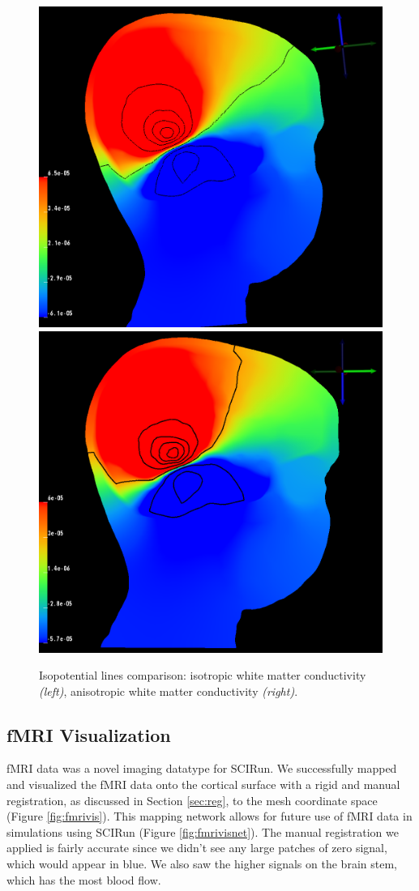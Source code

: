 \begin{figure}[H]
\begin{center}
\includegraphics[width=.49\textwidth]{Figures/iso_isolines}
\includegraphics[width = .49\textwidth]{Figures/aniso_isolines}
\caption{Isopotential lines comparison: isotropic white matter conductivity \textit{(left)}, anisotropic white matter conductivity \textit{(right)}.}
\label{fig:isolines}
\end{center}
\end{figure}

\subsection{fMRI Visualization}

fMRI data was a novel imaging datatype for SCIRun. We successfully mapped and visualized the fMRI data onto the cortical surface with a rigid and manual registration, as discussed in Section \ref{sec:reg}, to the mesh coordinate space (Figure \ref{fig:fmrivis}). This mapping network allows for future use of fMRI data in simulations using SCIRun (Figure \ref{fig:fmrivisnet}). The manual registration we applied is fairly accurate since we didn't see any large patches of zero signal, which would appear in blue. We also saw the higher signals on the brain stem, which has the most blood flow.


